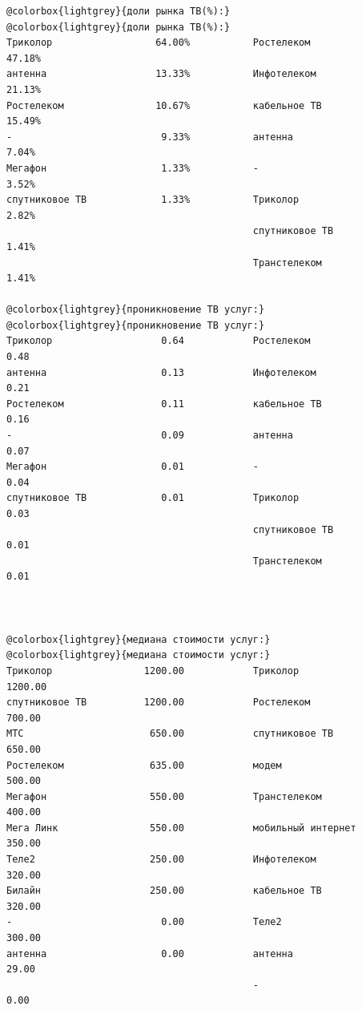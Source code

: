 \documentclass[unicode, 12pt, a4paper,oneside,fleqn]{article}
\begin{document}
\begin{Verbatim}[commandchars=@\{\}]
@colorbox{lightgrey}{доли рынка ТВ(%):}                         @colorbox{lightgrey}{доли рынка ТВ(%):}
Триколор                  64.00%           Ростелеком                47.18% 
антенна                   13.33%           Инфотелеком               21.13% 
Ростелеком                10.67%           кабельное ТВ              15.49% 
-                          9.33%           антенна                    7.04% 
Мегафон                    1.33%           -                          3.52% 
спутниковое ТВ             1.33%           Триколор                   2.82% 
                                           спутниковое ТВ             1.41% 
                                           Транстелеком               1.41% 

@colorbox{lightgrey}{проникновение ТВ услуг:}                   @colorbox{lightgrey}{проникновение ТВ услуг:}
Триколор                   0.64            Ростелеком                 0.48 
антенна                    0.13            Инфотелеком                0.21 
Ростелеком                 0.11            кабельное ТВ               0.16 
-                          0.09            антенна                    0.07 
Мегафон                    0.01            -                          0.04 
спутниковое ТВ             0.01            Триколор                   0.03 
                                           спутниковое ТВ             0.01 
                                           Транстелеком               0.01 


                                           
@colorbox{lightgrey}{медиана стоимости услуг:}                  @colorbox{lightgrey}{медиана стоимости услуг:}
Триколор                1200.00            Триколор                1200.00 
спутниковое ТВ          1200.00            Ростелеком               700.00 
МТС                      650.00            спутниковое ТВ           650.00 
Ростелеком               635.00            модем                    500.00 
Мегафон                  550.00            Транстелеком             400.00 
Мега Линк                550.00            мобильный интернет       350.00 
Теле2                    250.00            Инфотелеком              320.00 
Билайн                   250.00            кабельное ТВ             320.00 
-                          0.00            Теле2                    300.00 
антенна                    0.00            антенна                   29.00 
                                           -                          0.00 
 

\end{Verbatim}
\end{document}
